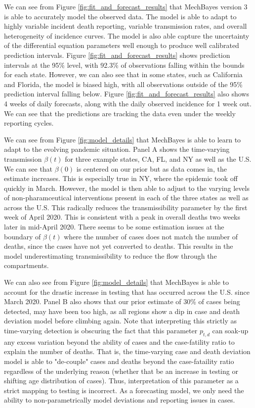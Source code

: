 \documentclass[11pt]{amsart}
\begin{document}
We can see from Figure \ref{fig:fit_and_forecast_results} that MechBayes version 3 is able to accurately model the observed data. The model is able to adapt to highly variable incident death reporting, variable transmission rates, and overall heterogeneity of incidence curves. The model is also able capture the uncertainty of the differential equation parameters well enough to produce well calibrated prediction intervals. Figure \ref{fig:fit_and_forecast_results}  shows prediction intervals at the 95\% level, with 92.3\% of observations falling within the bounds for each state. However, we can also see that in some states, such as California and Florida, the model is biased high, with all observations outside of the 95\% prediction interval falling below. Figure \ref{fig:fit_and_forecast_results}  also shows 4 weeks of daily forecasts, along with the daily observed incidence for 1 week out. We can see that the predictions are tracking the data even under the weekly reporting cycles. 

We can see from Figure \ref{fig:model_details} that MechBayes is able to learn to adapt to the evolving pandemic situation. Panel A shows the time-varying transmission $\beta(t)$ for three example states, CA, FL, and NY as well as the U.S. We can see that $\beta(0)$ is centered on our prior but as data comes in, the estimate increases. This is especially true in NY, where the epidemic took off quickly in March. However, the model is then able to adjust to the varying levels of non-pharamceutical interventions present in each of the three states as well as across the U.S. This radically reduces the transmissibility parameter by the first week of April 2020. This is consistent with a peak in overall deaths two weeks later in mid-April 2020. There seems to be some estimation issues at the boundary of $\beta(t)$ where the number of cases does not match the number of deaths, since the cases have not yet converted to deaths. This results in the model underestimating transmissibility to reduce the flow through the compartments. 

We can also see from Figure \ref{fig:model_details}  that MechBayes is able to account for the drastic increase in testing that has occurred across the U.S. since March 2020. Panel B also shows that our prior estimate of 30\% of cases being detected, may have been too high, as all regions show a dip in case and death deviation model before climbing again. Note that interpreting this strictly as time-varying detection is obscuring the fact that this parameter $p_{t,d}$ can soak-up any excess variation beyond the ability of cases and the case-fatility ratio to explain the number of deaths. That is, the time-varying case and death deviation model is able to "de-couple" cases and deaths beyond the case-fataility ratio regardless of the underlying reason (whether that be an increase in testing or shifting age distribution of cases). Thus, interpretation of this parameter as a strict mapping to testing is incorrect. As a forecasting model, we only need the ability to non-parametrically model deviations and reporting issues in cases.
\end{document}
